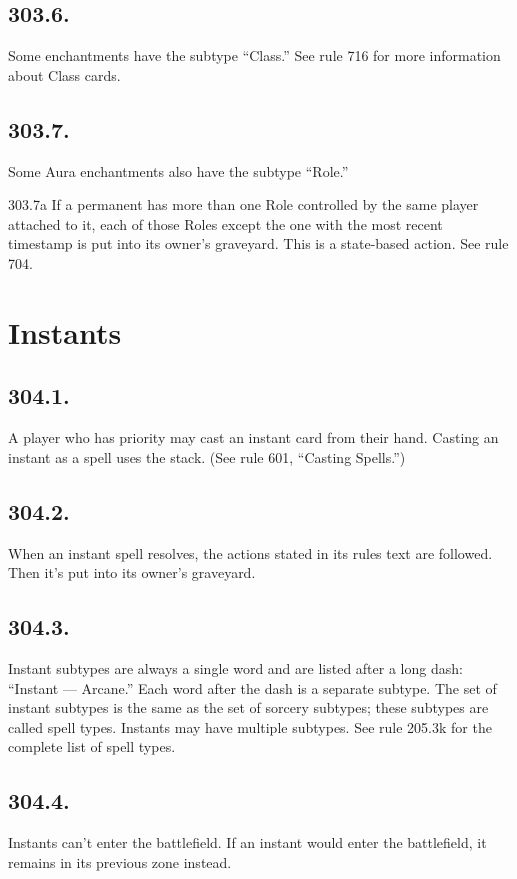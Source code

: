 \subsection*{303.6.}
Some enchantments have the subtype “Class.” See rule 716 for more information about Class cards.

\subsection*{303.7.}
Some Aura enchantments also have the subtype “Role.”

303.7a If a permanent has more than one Role controlled by the same player attached to it, each of those Roles except the one with the most recent timestamp is put into its owner’s graveyard. This is a state-based action. See rule 704.

\section{Instants}
\subsection*{304.1.}
A player who has priority may cast an instant card from their hand. Casting an instant as a spell uses the stack. (See rule 601, “Casting Spells.”)

\subsection*{304.2.}
When an instant spell resolves, the actions stated in its rules text are followed. Then it’s put into its owner’s graveyard.

\subsection*{304.3.}
Instant subtypes are always a single word and are listed after a long dash: “Instant — Arcane.” Each word after the dash is a separate subtype. The set of instant subtypes is the same as the set of sorcery subtypes; these subtypes are called spell types. Instants may have multiple subtypes. See rule 205.3k for the complete list of spell types.

\subsection*{304.4.}
Instants can’t enter the battlefield. If an instant would enter the battlefield, it remains in its previous zone instead.


